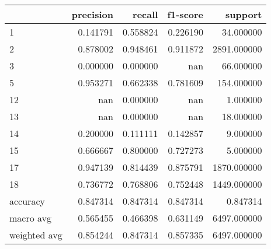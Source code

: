\begin{tabular}{lrrrr}
\toprule
 & precision & recall & f1-score & support \\
\midrule
1 & 0.141791 & 0.558824 & 0.226190 & 34.000000 \\
2 & 0.878002 & 0.948461 & 0.911872 & 2891.000000 \\
3 & 0.000000 & 0.000000 & nan & 66.000000 \\
5 & 0.953271 & 0.662338 & 0.781609 & 154.000000 \\
12 & nan & 0.000000 & nan & 1.000000 \\
13 & nan & 0.000000 & nan & 18.000000 \\
14 & 0.200000 & 0.111111 & 0.142857 & 9.000000 \\
15 & 0.666667 & 0.800000 & 0.727273 & 5.000000 \\
17 & 0.947139 & 0.814439 & 0.875791 & 1870.000000 \\
18 & 0.736772 & 0.768806 & 0.752448 & 1449.000000 \\
accuracy & 0.847314 & 0.847314 & 0.847314 & 0.847314 \\
macro avg & 0.565455 & 0.466398 & 0.631149 & 6497.000000 \\
weighted avg & 0.854244 & 0.847314 & 0.857335 & 6497.000000 \\
\bottomrule
\end{tabular}
